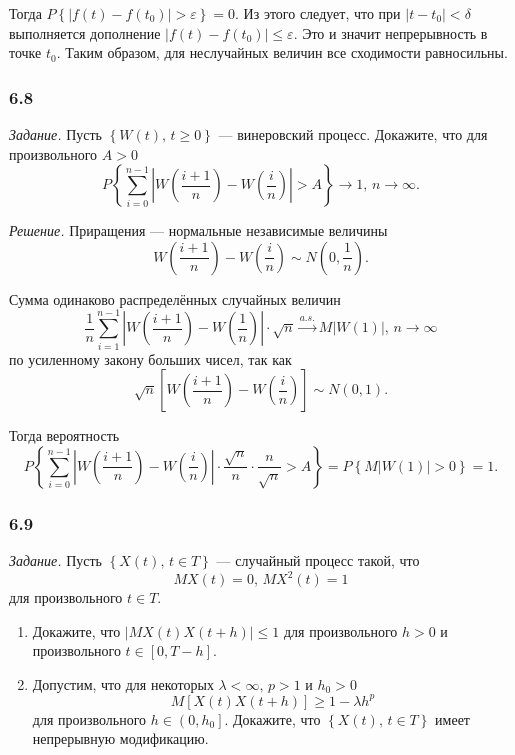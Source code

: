 Тогда
$P \left\{ \left| f \left( t \right) - f \left( t_0 \right) \right| > \varepsilon \right\} =
  0$.
Из этого следует, что при $ \left| t - t_0 \right| < \delta $ выполняется дополнение
$ \left| f \left( t \right) - f \left( t_0 \right) \right| \leq
  \varepsilon $.
Это и значит непрерывность в точке $t_0$.
Таким образом, для неслучайных величин все сходимости равносильны.

\subsubsection*{6.8}

\textit{Задание.}
Пусть $ \left\{ W \left( t \right), \, t \geq 0 \right\} $ --- винеровский процесс.
Докажите, что для произвольного $A > 0$
$$P \left\{
    \sum \limits_{i = 0}^{n - 1}
      \left| W \left( \frac{i + 1}{n} \right) - W \left( \frac{i}{n} \right) \right| > A
  \right\} \to
  1, \,
  n \to \infty.$$

\textit{Решение.}
Приращения --- нормальные независимые величины
$$W \left( \frac{i + 1}{n} \right) - W \left( \frac{i}{n} \right) \sim
  N \left( 0, \frac{1}{n} \right).$$

Сумма одинаково распределённых случайных величин
$$ \frac{1}{n} \sum \limits_{i = 1}^{n - 1}
    \left| W \left( \frac{i + 1}{n} \right) - W \left( \frac{1}{n} \right) \right| \cdot
  \sqrt{n} \overset{a.s.}{ \to }
  M \left| W \left( 1 \right) \right|, \,
  n \to \infty $$
по усиленному закону больших чисел, так как
$$ \sqrt{n} \left[ W \left( \frac{i + 1}{n} \right) - W \left( \frac{i}{n} \right) \right] \sim
  N \left( 0, 1 \right).$$

Тогда вероятность
$$P \left\{
    \sum \limits_{i = 0}^{n - 1}
      \left| W \left( \frac{i + 1}{n} \right) - W \left( \frac{i}{n} \right) \right| \cdot
    \frac{ \sqrt{n}}{n} \cdot \frac{n}{ \sqrt{n}} > A \right\} =
  P \left\{ M \left| W \left( 1 \right) \right| > 0 \right\} =
  1.$$

\subsubsection*{6.9}

\textit{Задание.}
Пусть $ \left\{ X \left( t \right), \, t \in T \right\} $ --- случайный процесс такой, что
$$MX \left( t \right) = 0, \,
  MX^2 \left( t \right) = 1$$
для произвольного $t \in T$.
\begin{enumerate}[label=\alph*)]
  \item Докажите, что $ \left| MX \left( t \right) X \left( t + h \right) \right| \leq 1$
  для произвольного $h > 0$ и произвольного $t \in \left[ 0, T - h \right] $.
  \item Допустим, что для некоторых $ \lambda < \infty, \, p > 1$ и $h_0 > 0$
  $$M \left[ X \left( t \right) X \left( t + h \right) \right] \geq
    1 - \lambda h^p$$
  для произвольного $h \in \left( 0, h_0 \right] $.
  Докажите, что $ \left\{ X \left( t \right), \, t \in T \right\} $ имеет непрерывную модификацию.
\end{enumerate}

